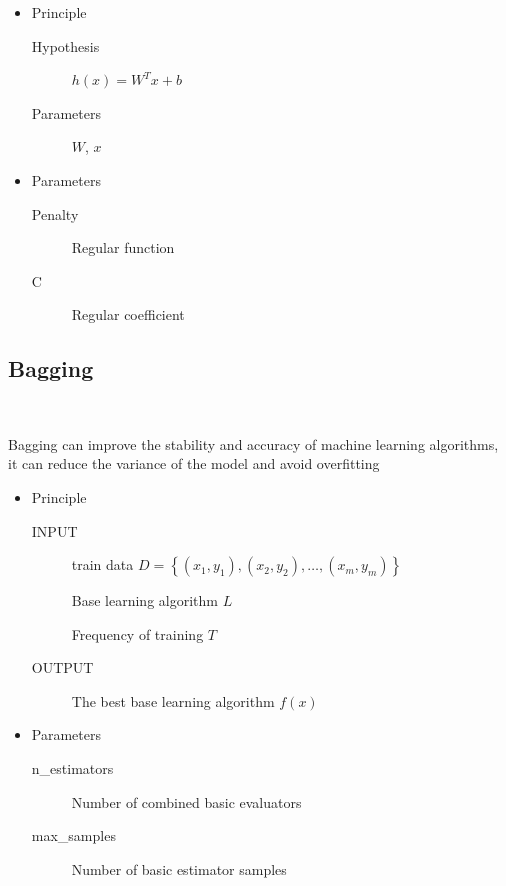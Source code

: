 \begin{itemize}
	\item Principle
	
	\begin{description}
		\item[Hypothesis] $h(x)=W^{T} x+b$
		\item[Parameters] $ W$, $x$
	\end{description}
	
	\item Parameters
	
	\begin{description}
		\item[Penalty] Regular function
		\item[C] Regular coefficient
	\end{description}
	
\end{itemize}

\subsection{Bagging}
\

Bagging can improve the stability and accuracy 
of machine learning algorithms, 
it can reduce the variance of 
the model and avoid overfitting

\begin{itemize}
	\item Principle
	
	\begin{description}
		\item[INPUT] train data $ D = \left\{ 
		\left(x_1,y_1 \right), \left(x_2,y_2 \right),
		\dots,\left(x_m,y_m \right) \right\}$
		
		Base learning algorithm $L$
	
		Frequency of training $T$
		\item[OUTPUT] The best base learning algorithm $f(x)$
	
	\end{description}
	
	\item Parameters
	
	\begin{description}
		\item[n_estimators] Number of combined basic evaluators
		\item[max_samples] Number of basic estimator samples
	\end{description}
	
\end{itemize}

